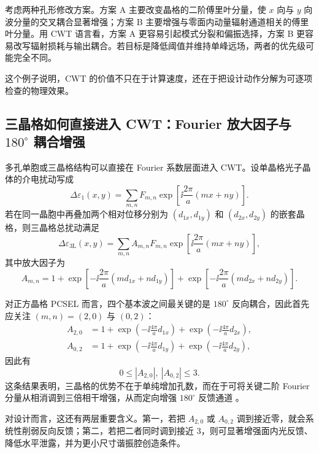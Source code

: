考虑两种孔形修改方案。方案 A 主要改变晶格的二阶傅里叶分量，使 $x$ 向与 $y$ 向波分量的交叉耦合显著增强；方案 B 主要增强与零面内动量辐射通道相关的傅里叶分量。用 CWT 语言看，方案 A 更容易引起模式分裂和偏振选择，方案 B 更容易改写辐射损耗与输出耦合。若目标是降低阈值并维持单峰远场，两者的优先级可能完全不同。

这个例子说明，CWT 的价值不只在于计算速度，还在于把设计动作分解为可逐项检查的物理效果。

\subsection{三晶格如何直接进入 CWT：Fourier 放大因子与 \texorpdfstring{$180^\circ$}{180 deg} 耦合增强}
多孔单胞或三晶格结构可以直接在 Fourier 系数层面进入 CWT。设单晶格光子晶体的介电扰动写成
\begin{equation}
  \Delta\varepsilon_{1}(x,y)
  =
  \sum_{m,n}F_{m,n}\exp\!\left[\ii\frac{2\pi}{a}(mx+ny)\right].
\end{equation}
若在同一晶胞中再叠加两个相对位移分别为 $(d_{1x},d_{1y})$ 和 $(d_{2x},d_{2y})$ 的嵌套晶格，则三晶格总扰动满足
\begin{equation}
  \Delta\varepsilon_{\mathrm{3L}}(x,y)
  =
  \sum_{m,n}A_{m,n}F_{m,n}\exp\!\left[\ii\frac{2\pi}{a}(mx+ny)\right],
\end{equation}
其中放大因子为
\begin{equation}
  A_{m,n}
  =
  1+\exp\!\left[-\ii\frac{2\pi}{a}(md_{1x}+nd_{1y})\right]
  +\exp\!\left[-\ii\frac{2\pi}{a}(md_{2x}+nd_{2y})\right].
\label{eq:trilattice_amplification}
\end{equation}

对正方晶格 PCSEL 而言，四个基本波之间最关键的是 $180^\circ$ 反向耦合，因此首先应关注 $(m,n)=(2,0)$ 与 $(0,2)$：
\begin{align}
  A_{2,0} &= 1+\exp\!\left(-\ii\frac{4\pi}{a}d_{1x}\right)+\exp\!\left(-\ii\frac{4\pi}{a}d_{2x}\right), \\
  A_{0,2} &= 1+\exp\!\left(-\ii\frac{4\pi}{a}d_{1y}\right)+\exp\!\left(-\ii\frac{4\pi}{a}d_{2y}\right),
\end{align}
因此有
\begin{equation}
  0\le |A_{2,0}|,\ |A_{0,2}|\le 3.
\label{eq:trilattice_amplification_bound}
\end{equation}
这条结果表明，三晶格的优势不在于单纯增加孔数，而在于可将关键二阶 Fourier 分量从相消调到三倍相干增强，从而定向增强 $180^\circ$ 反馈通道 \cite{liang2013triangular,wang2024}。

对设计而言，这还有两层重要含义。第一，若把 $A_{2,0}$ 或 $A_{0,2}$ 调到接近零，就会系统性削弱反向反馈；第二，若把二者同时调到接近 3，则可显著增强面内光反馈、降低水平泄露，并为更小尺寸谐振腔创造条件。


